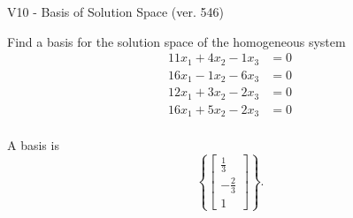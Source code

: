 \begin{exercise}
  \begin{exerciseTitle}V10 - Basis of Solution Space (ver. 546)\end{exerciseTitle}
  \begin{exerciseStatement}
    Find a basis for the solution space of the homogeneous system 
\begin{align*}
 11 x_ 1 + 4 x_ 2 -1 x_ 3 &= 0  \\ 
  16 x_ 1 -1 x_ 2 -6 x_ 3 &= 0  \\ 
  12 x_ 1 + 3 x_ 2 -2 x_ 3 &= 0  \\ 
  16 x_ 1 + 5 x_ 2 -2 x_ 3 &= 0  \\ 
 \end{align*}


 
  \end{exerciseStatement}

  \begin{exerciseAnswer}
   A basis is   
\[\left\{\left[\begin{array}{c}
\frac{1}{3} \\
-\frac{2}{3} \\
1
\end{array}\right]\right\}.\]

  


  \end{exerciseAnswer}
\end{exercise}